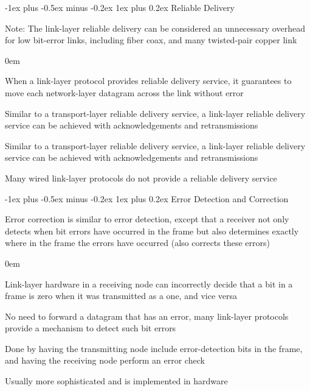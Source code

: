 \documentclass[letterpaper,8pt]{extarticle}
\makeatletter
\renewcommand{\subsubsection}{\@startsection{subsubsection}{3}{0mm}%
  {-1ex plus -0.5ex minus -0.2ex}%
  {1ex plus 0.2ex}%
{\color{h3} \normalfont\fontsize{5.5}{5.5}\selectfont\bfseries\itshape}}
\let\olditemize\itemize \let\endolditemize\enditemize
\renewenvironment{itemize}{\olditemize \itemsep0em}{\endolditemize}
\makeatother
\begin{document}
\begin{multicols*}{5}
  \subsubsection{Reliable Delivery}
  
  Note: The link-layer reliable delivery can be considered an unnecessary overhead for low bit-error links, including fiber coax, and many twisted-pair copper link
  
  \begin{itemize}
    \item When a link-layer protocol provides reliable delivery service, it guarantees to move each network-layer datagram across the link without error
    \item Similar to a transport-layer reliable delivery service, a link-layer reliable delivery service can be achieved with acknowledgements and retransmissions
    \item Similar to a transport-layer reliable delivery service, a link-layer reliable delivery service can be achieved with acknowledgements and retransmissions
    \item Many wired link-layer protocols do not provide a reliable delivery service
  \end{itemize}
  
  \subsubsection{Error Detection and Correction}
  
  Error correction is similar to error detection, except that a receiver not only detects when bit errors have occurred in the frame but also determines exactly where in the frame the errors have occurred (also corrects these errors)
  
  \begin{itemize}
    \item Link-layer hardware in a receiving node can incorrectly decide that a bit in a frame is zero when it was transmitted as a one, and vice versa
    \item No need to forward a datagram that has an error, many link-layer protocols provide a mechanism to detect such bit errors
    \item Done by having the transmitting node include error-detection bits in the frame, and having the receiving node perform an error check
    \item Usually more sophisticated and is implemented in hardware
  \end{itemize}
  

\end{multicols*}
\end{document}
